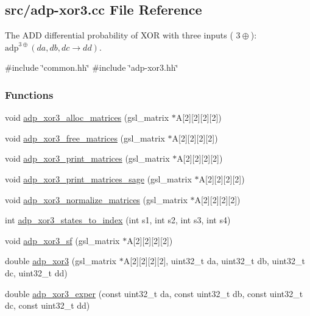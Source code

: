 \hypertarget{adp-xor3_8cc}{\subsection{src/adp-\/xor3.cc \-File \-Reference}
\label{adp-xor3_8cc}
}


\-The \-A\-D\-D differential probability of \-X\-O\-R with three inputs ( $3\oplus$)\-: $\mathrm{adp}^{3\oplus}(da,db,dc \rightarrow dd)$.  


{\ttfamily \#include \char`\"{}common.\-hh\char`\"{}}\*
{\ttfamily \#include \char`\"{}adp-\/xor3.\-hh\char`\"{}}\*
\subsubsection*{\-Functions}
\begin{DoxyCompactItemize}
\item 
void \hyperlink{adp-xor3_8cc_a74f6e7378f7e6c853acc038410039f4a}{adp\-\_\-xor3\-\_\-alloc\-\_\-matrices} (gsl\-\_\-matrix $\ast$\-A\mbox{[}2\mbox{]}\mbox{[}2\mbox{]}\mbox{[}2\mbox{]}\mbox{[}2\mbox{]})
\item 
void \hyperlink{adp-xor3_8cc_abf05505e86f5bb3298cc0ebea3f0dd06}{adp\-\_\-xor3\-\_\-free\-\_\-matrices} (gsl\-\_\-matrix $\ast$\-A\mbox{[}2\mbox{]}\mbox{[}2\mbox{]}\mbox{[}2\mbox{]}\mbox{[}2\mbox{]})
\item 
void \hyperlink{adp-xor3_8cc_aac86169eeb2495e0c44b856b5c6b11b5}{adp\-\_\-xor3\-\_\-print\-\_\-matrices} (gsl\-\_\-matrix $\ast$\-A\mbox{[}2\mbox{]}\mbox{[}2\mbox{]}\mbox{[}2\mbox{]}\mbox{[}2\mbox{]})
\item 
void \hyperlink{adp-xor3_8cc_ad4022d70aae8155141f5f845bee103fc}{adp\-\_\-xor3\-\_\-print\-\_\-matrices\-\_\-sage} (gsl\-\_\-matrix $\ast$\-A\mbox{[}2\mbox{]}\mbox{[}2\mbox{]}\mbox{[}2\mbox{]}\mbox{[}2\mbox{]})
\item 
void \hyperlink{adp-xor3_8cc_a2e47c316522917ac1c7e1de1ae6b214a}{adp\-\_\-xor3\-\_\-normalize\-\_\-matrices} (gsl\-\_\-matrix $\ast$\-A\mbox{[}2\mbox{]}\mbox{[}2\mbox{]}\mbox{[}2\mbox{]}\mbox{[}2\mbox{]})
\item 
int \hyperlink{adp-xor3_8cc_acb00f7be212378d2c43e9a3dd7db71ef}{adp\-\_\-xor3\-\_\-states\-\_\-to\-\_\-index} (int s1, int s2, int s3, int s4)
\item 
void \hyperlink{adp-xor3_8cc_a229a19749624926d15eb5b1731379855}{adp\-\_\-xor3\-\_\-sf} (gsl\-\_\-matrix $\ast$\-A\mbox{[}2\mbox{]}\mbox{[}2\mbox{]}\mbox{[}2\mbox{]}\mbox{[}2\mbox{]})
\item 
double \hyperlink{adp-xor3_8cc_a980a22f6faf155e031f0d9f7e8ca9361}{adp\-\_\-xor3} (gsl\-\_\-matrix $\ast$\-A\mbox{[}2\mbox{]}\mbox{[}2\mbox{]}\mbox{[}2\mbox{]}\mbox{[}2\mbox{]}, uint32\-\_\-t da, uint32\-\_\-t db, uint32\-\_\-t dc, uint32\-\_\-t dd)
\item 
double \hyperlink{adp-xor3_8cc_aafab7c51890d39cedee9a09d2c1629dd}{adp\-\_\-xor3\-\_\-exper} (const uint32\-\_\-t da, const uint32\-\_\-t db, const uint32\-\_\-t dc, const uint32\-\_\-t dd)
\end{DoxyCompactItemize}


